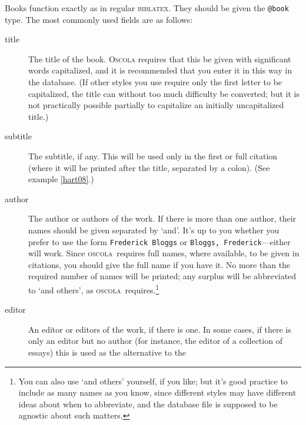 \documentclass[a5paper,fontsize=9pt,DIV=1]{scrartcl}
\newcommand{\biblatex}{\textsc{biblatex}}
\newcommand{\oscolashort}{\textsc{oscola}\nocite{oscola}}
\begin{document}
Books function exactly as in regular \biblatex. They should be given
the \texttt{@book} type. The most commonly used fields are as follows:
\begin{description}
\item[title] 
  The title of the book. \textsc{Oscola} requires that this
  be given with significant words capitalized, and it is recommended
  that you enter it in this way in the database. (If other styles you
  use require only the first letter to be capitalized, the title can
  without too much difficulty be converted; but it is not practically
  possible partially to capitalize an initially uncapitalized title.)
\item[subtitle]
  The subtitle, if any. This will be used only in the
  first or full citation (where it will be printed after the title,
  separated by a colon). (See example \ref{hart08}.)
\item[author]
  The author or authors of the work. If there is more than
  one author, their names should be given separated by `and'. It's up
  to you whether you prefer to use the form \texttt{Frederick Bloggs}
  or \texttt{Bloggs, Frederick}---either will work. Since
  \oscolashort\ requires full names, where available, to be given in
  citations, you should give the full name if you have it. No more than the required number of names will be printed;
  any surplus will be abbreviated to `and others', as
  \oscolashort\ requires.\footnote{You can also use `and others'
    yourself, if you like; but it's good practice to include as many
    names as you know, since different styles may have different ideas
    about when to abbreviate, and the database file is supposed to be
    agnostic about such matters.}
\item[editor]
  An editor or editors of the work, if there is one. In some cases,
  if there is only an editor but no author (for instance, the editor
  of a collection of essays) this is used as the alternative to the

\end{description}
\end{document}
